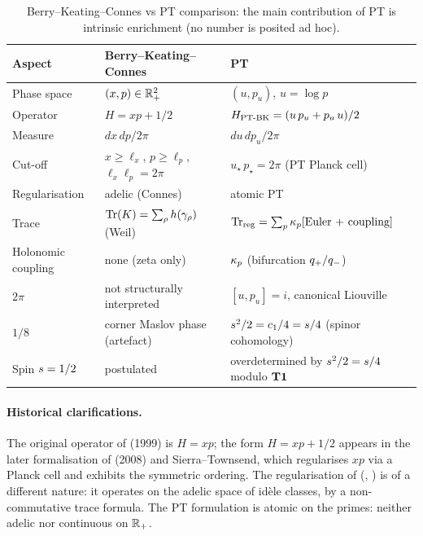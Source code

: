 \begin{table}[ht]
\centering
\small
\begin{tabular}{@{}p{3cm}p{4.5cm}p{5cm}@{}}
\toprule
\textbf{Aspect} & \textbf{Berry--Keating--Connes} & \textbf{PT}\\
\midrule
Phase space & $(x, p) \in \mathbb{R}_+^{2}$ & $(u, p_u)$, $u = \log p$\\
Operator & $H = xp + 1/2$ & $H_{\mathrm{PT\text{-}BK}} = (u\,p_u + p_u\,u)/2$\\
Measure & $dx\,dp / 2\pi$ & $du\,dp_u / 2\pi$\\
Cut-off & $x \ge \ell_x$, $p \ge \ell_p$, $\ell_x \ell_p = 2\pi$ & $u_\star\,p_\star = 2\pi$ (PT Planck cell)\\
Regularisation & adelic (Connes) & atomic PT\\
Trace & $\operatorname{Tr}(K) = \sum_\rho h(\gamma_\rho)$ (Weil) & $\operatorname{Tr}_{\mathrm{reg}} = \sum_p \kappa_p [\text{Euler + coupling}]$\\
Holonomic coupling & none (zeta only) & $\kappa_p$ (bifurcation $q_{+}/q_{-}$)\\
$2\pi$ & not structurally interpreted & $[u, p_u] = i$, canonical Liouville\\
$1/8$ & corner Maslov phase (artefact) & $s^{2}/2 = c_1/4 = s/4$ (spinor cohomology)\\
Spin $s = 1/2$ & postulated & overdetermined by $s^{2}/2 = s/4$ modulo $\textbf{T1}$\\
\bottomrule
\end{tabular}
\caption{Berry--Keating--Connes vs PT comparison: the main
contribution of PT is intrinsic enrichment (no number is posited ad
hoc).}
\label{tab:comparaison_BKC}
\end{table}

\paragraph{Historical clarifications.}
The original operator of \citeauthor{BerryKeating1999} (1999) is
$H = xp$; the form $H = xp + 1/2$ appears in the later formalisation
of \citeauthor{Sierra2008} (2008) and Sierra--Townsend, which
regularises $xp$ via a Planck cell and exhibits the symmetric
ordering. The regularisation of \citeauthor{Connes1996}
(\citeyear{Connes1996}, \citeyear{Connes1999}) is of a different
nature: it operates on the adelic space of id\`ele classes, by a
non-commutative trace formula. The PT formulation is atomic on the
primes: neither adelic nor continuous on $\mathbb{R}_+$.

